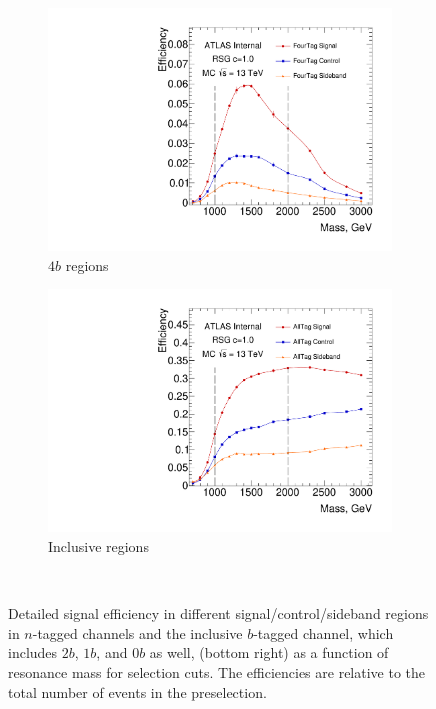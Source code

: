 \begin{figure}[htb!]
    \begin{subfigure}[b]{0.4\textwidth}
        \includegraphics[width=\textwidth,angle=-90]{figures/boosted/SigEff/region_4b_lst_Moriond_Efficiency_PreSel.pdf}
        \caption{$4b$ regions}
        \label{fig:4b-selection-region-efficiency}
    \end{subfigure}
    \quad \quad 
    \begin{subfigure}[b]{0.4\textwidth}
        \includegraphics[width=\textwidth,angle=-90]{figures/boosted/SigEff/region_alltag_lst_Moriond_Efficiency_PreSel.pdf}
        \caption{Inclusive regions}
        \label{fig:alltag-selection-region-efficiency}
    \end{subfigure} \\ 
   \caption{
   Detailed signal efficiency in different signal/control/sideband regions in $n$-tagged channels and the inclusive $b$-tagged channel, which includes $2b$, $1b$, and 0$b$ as well, (bottom right) as a function of \Grav~ resonance mass for selection cuts. The efficiencies are relative to the total number of events in the preselection.}
  \label{fig:boosted-selection-region-efficiency}
\end{figure}


